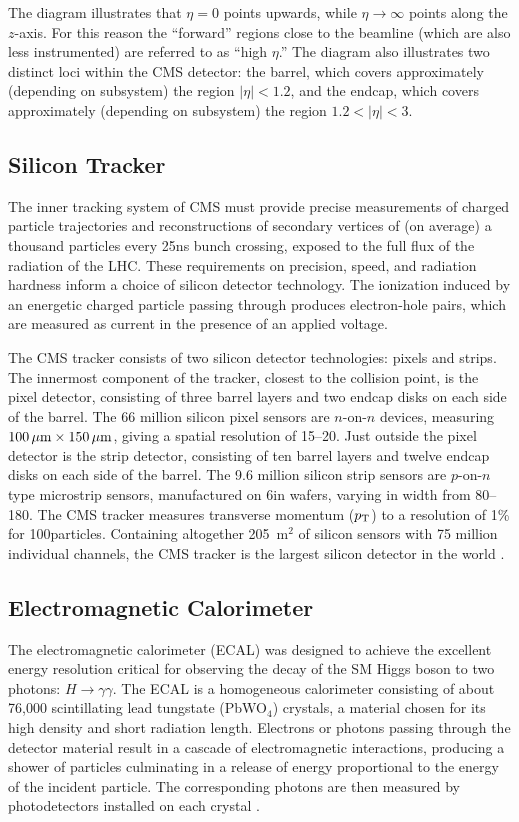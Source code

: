 The diagram illustrates that $\eta = 0$ points upwards, while $\eta \to \infty$ points along the $z$-axis.
For this reason the ``forward'' regions close to the beamline (which are also less instrumented) are referred to as ``high $\eta$.''
The diagram also illustrates two distinct loci within the CMS detector: the barrel, which covers approximately (depending on subsystem) the region $|\eta| < 1.2$, and the endcap, which covers approximately (depending on subsystem) the region $1.2 < |\eta| < 3$.

\pagebreak
\subsection{Silicon Tracker}
The inner tracking system of CMS must provide precise measurements of charged particle trajectories and reconstructions of secondary vertices of (on average) a thousand particles every 25\unit{ns} bunch crossing, exposed to the full flux of the radiation of the LHC.
These requirements on precision, speed, and radiation hardness inform a choice of silicon detector technology.
The ionization induced by an energetic charged particle passing through produces electron-hole pairs, which are measured as current in the presence of an applied voltage.

The CMS tracker consists of two silicon detector technologies: pixels and strips.
The innermost component of the tracker, closest to the collision point, is the pixel detector, consisting of three barrel layers and two endcap disks on each side of the barrel.
The 66 million silicon pixel sensors are $n$-on-$n$ devices, measuring $100 \,\mu\text{m} \times 150 \,\mu\text{m}$, giving a spatial resolution of 15--20\mum.
Just outside the pixel detector is the strip detector, consisting of ten barrel layers and twelve endcap disks on each side of the barrel.
The 9.6 million silicon strip sensors are $p$-on-$n$ type microstrip sensors, manufactured on 6\unit{in} wafers, varying in width from 80--180\mum.
The CMS tracker measures transverse momentum ($p_{\mathrm{T}}$) to a resolution of 1\% for 100\GeV particles.
Containing altogether 205~$\text{m}^2$ of silicon sensors with 75 million individual channels, the CMS tracker is the largest silicon detector in the world \cite{Chatrchyan:2008zzk, CERN-LHCC-98-006, HARTMANN201225}.


\subsection{Electromagnetic Calorimeter}
The electromagnetic calorimeter (ECAL) was designed to achieve the excellent energy resolution critical for observing the decay of the SM Higgs boson to two photons: $H \to \gamma\gamma$.
The ECAL is a homogeneous calorimeter consisting of about 76,000 scintillating lead tungstate (PbWO$_4$) crystals, a material chosen for its high density and short radiation length.
Electrons or photons passing through the detector material result in a cascade of electromagnetic interactions, producing a shower of particles culminating in a release of energy proportional to the energy of the incident particle.
The corresponding photons are then measured by photodetectors installed on each crystal \cite{Chatrchyan:2008zzk, CERN-LHCC-97-033, Fabjan:692252}.

